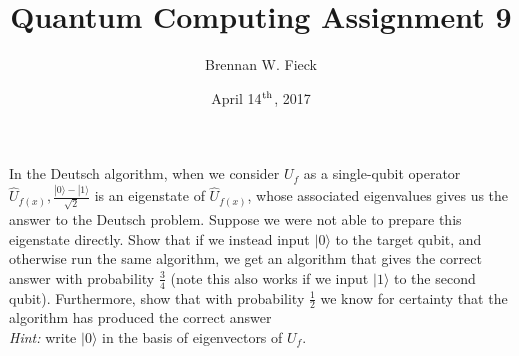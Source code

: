 \documentclass[12pt]{article}
\newenvironment{problem}[2][Problem]{\begin{trivlist}
\item[\hskip \labelsep {\bfseries #1}\hskip \labelsep {\bfseries #2.}]}{\end{trivlist}}
\begin{document}
 
 
\title{Quantum Computing Assignment 9}
\author{Brennan W. Fieck}
\date{April 14$^\textnormal{th}$, 2017}
\maketitle

\begin{problem}{6.3.1}
In the Deutsch algorithm, when we consider $U_f$ as a single-qubit operator $\hat{U}_{f(x)},\frac{|0\rangle-|1\rangle}{\sqrt{2}}$ is an
eigenstate of $\hat{U}_{f(x)}$, whose associated eigenvalues gives us the answer to the Deutsch problem. Suppose we were not able to
prepare this eigenstate directly. Show that if we instead input $|0\rangle$ to the target qubit, and otherwise run the same algorithm,
we get an algorithm that gives the correct answer with probability $\frac{3}{4}$ (note this also works if we input $|1\rangle$ to the
second qubit). Furthermore, show that with probability $\frac{1}{2}$ we know for certainty that the algorithm has produced the correct
answer\\[0.3in]
\emph{Hint:} write $|0\rangle$ in the basis of eigenvectors of $U_f$.
\end{problem}
\end{document}
